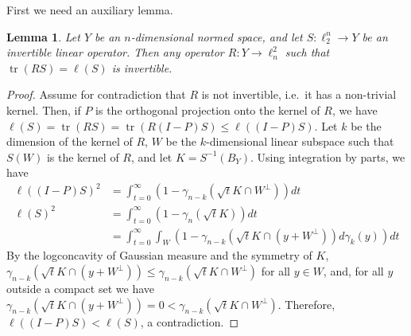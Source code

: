 \documentclass{article}
\newtheorem{lemma}{Lemma}
\DeclareMathOperator{\tr}{tr}
\begin{document}
First we need an auxiliary lemma. 

\begin{lemma}\label{lm:invertible}
  Let $Y$ be an $n$-dimensional normed space, and let $S:\ell_2^n \to
  Y$ be an invertible linear operator. Then any operator $R:Y \to
  \ell^2_n$ such that $\tr(RS) = \ell(S)$ is invertible.
\end{lemma}
\begin{proof}
  Assume for contradiction that $R$ is not invertible, i.e.~it has a
  non-trivial kernel. Then, if $P$ is the orthogonal projection onto
  the kernel of $R$, we have $\ell(S) = \tr(RS) = \tr(R(I-P)S) \le
  \ell((I-P)S)$. Let $k$ be the dimension of the kernel of $R$, $W$ be
  the $k$-dimensional linear subspace such that $S(W)$ is the kernel
  of $R$, and let $K = S^{-1}(B_Y)$. Using integration by parts,
  we have
  \begin{align*}
  \ell((I-P)S)^2 &= \int_{t = 0}^\infty (1-\gamma_{n-k}(\sqrt{t}K\cap W^\perp))dt\\
  \ell(S)^2 &= \int_{t = 0}^\infty (1-\gamma_n(\sqrt{t}K))dt\\
  &= \int_{t = 0}^\infty \int_{W}(1-\gamma_{n-k}(\sqrt{t}K \cap (y + W^\perp))d\gamma_{k}(y))dt
  \end{align*}
  By the logconcavity of Gaussian measure and the symmetry of $K$,
  $\gamma_{n-k}(\sqrt{t}K \cap (y + W^\perp)) \le \gamma_{n-k}(\sqrt{t}K \cap
  W^\perp)$ for all $y \in W$, and, for all $y$ outside a
  compact set we have $\gamma_{n-k}(\sqrt{t}K \cap (y + W^\perp)) = 0 <
  \gamma_{n-k}(\sqrt{t}K \cap W^\perp)$. Therefore, $\ell((I-P)S) < \ell(S)$, a
  contradiction.
\end{proof}
\end{document}
